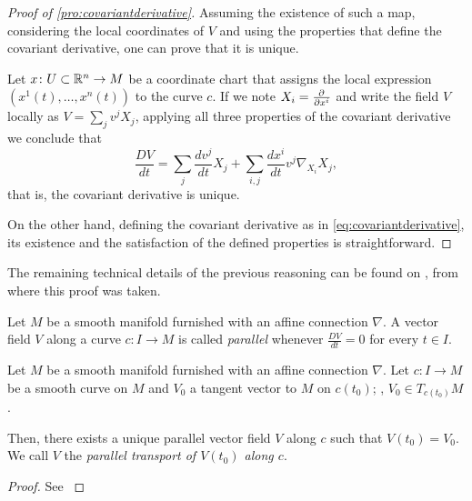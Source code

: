 \begin{proof}[Proof of \autoref{pro:covariantderivative}]
	Assuming the existence of such a map, considering the local coordinates of $V$ and using the properties that define the covariant derivative, one can prove that it is unique.
	
	Let $x \colon U \subset \mathbb{R}^n \to M$ be a coordinate chart that assigns the local expression $(x^1(t), \dots, x^n(t))$ to the curve $c$. If we note $X_i = \frac{\partial^{} }{\partial x^i}$ and write the field $V$ locally as $V = \sum_j v^j X_j$, applying all three properties of the covariant derivative we conclude that
	\begin{equation}
	\label{eq:covariantderivative}
		\frac{DV}{dt} = \sum_j \frac{d v^j}{dt} X_j + \sum_{i,j} \frac{d x^i}{dt} v^j \nabla_{X_i} X_j,
	\end{equation}
	that is, the covariant derivative is unique.
	
	On the other hand, defining the covariant derivative as in \autoref{eq:covariantderivative}, its existence and the satisfaction of the defined properties is straightforward.
\end{proof}

The remaining technical details of the previous reasoning can be found on \cite[p. 43]{docarmo79}, from where this proof was taken.

\begin{definition}
	Let $M$ be a smooth manifold furnished with an affine connection $\nabla$. A vector field $V$ along a curve $c \colon I \to M$ is called \emph{parallel} whenever $\frac{DV}{dt} = 0$ for every $t \in I$.
\end{definition}

\begin{proposition}[Parallel transport]
	Let $M$ be a smooth manifold furnished with an affine connection $\nabla$. Let $c \colon I \to M$ be a smooth curve on $M$ and $V_0$ a tangent vector to $M$ on $c(t_0)$; \ie, $V_0 \in T_{c(t_0)} M$.
	
	Then, there exists a unique parallel vector field $V$ along $c$ such that $V(t_0) = V_0$. We call $V$ the \emph{parallel transport of $V(t_0)$ along $c$}.
\end{proposition}

\begin{proof}
	See \cite[Proposition 2.6 on section 2.2]{docarmo79}
\end{proof}

